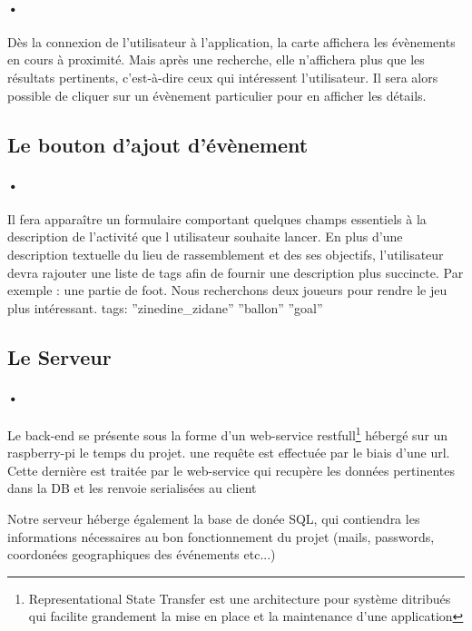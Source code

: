 \documentclass[pdftex,12pt,a4paper]{article}
\begin{document}
\paragraph{•}
D\`es la connexion de l'utilisateur \`a l'application, la carte affichera les \'ev\`enements en cours \`a proximit\'e. Mais apr\`es une recherche, elle n'affichera plus que les r\'esultats pertinents, c’est-à-dire ceux qui int\'eressent l'utilisateur. Il sera alors possible de cliquer sur un \'ev\`enement particulier pour en afficher les d\'etails. 

\subsection{Le bouton d'ajout d'\'ev\`enement}
\paragraph{•}
Il fera appara\^itre un formulaire comportant quelques champs essentiels à la description de l'activit\'e que l utilisateur souhaite lancer. En plus d'une description textuelle du lieu de rassemblement et des ses objectifs, l'utilisateur devra rajouter une liste de tags afin de fournir une description plus succincte.
Par exemple : une partie de foot. Nous recherchons deux joueurs pour rendre le jeu plus int\'eressant. tags: ''zinedine\_zidane'' ''ballon'' ''goal''

\subsection{Le Serveur}
\paragraph{•}
Le back-end se pr\'esente sous la forme d'un web-service restfull\footnote{Representational State Transfer est une architecture 
pour syst\`eme ditribu\'es qui facilite grandement la mise en place et la maintenance d'une application} h\'eberg\'e sur un raspberry-pi le temps du projet.
une requ\^ete est effectu\'ee par le biais d'une url. Cette derni\`ere est trait\'ee par le web-service 
qui recup\`ere les donn\'ees pertinentes dans la DB et les renvoie serialis\'ees au client

Notre serveur h\'eberge \'egalement la base de don\'ee SQL, qui contiendra les informations n\'ecessaires au bon fonctionnement du projet (mails, passwords, coordon\'ees geographiques des \'ev\'enements etc...)

\newpage
\end{document}
